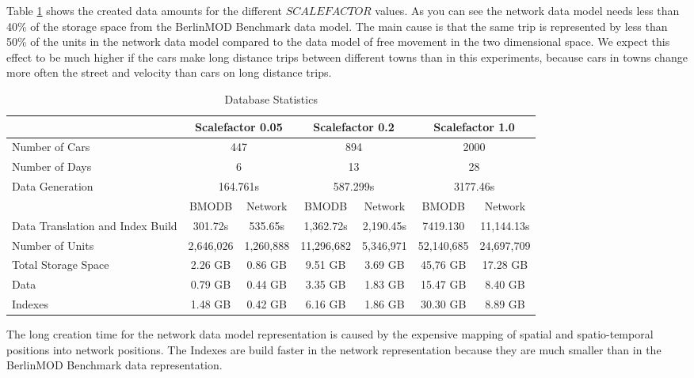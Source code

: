 \documentclass[a4paper]{article}
\newcommand{\bmodb} {BerlinMOD Benchmark}
\begin{document}
Table \ref{tab:dbstat} shows the created data amounts for the different $SCALEFACTOR$
values. As you can see the network data model needs less than 40\% of the storage
space from the \bmodb{} data model. The main cause is that the same trip is represented
by less than 50\% of the units in the network data model compared to the data
model of free movement in the two dimensional space. We expect this effect to be much
higher if the cars make long distance trips between different towns than in this
experiments, because cars in towns change more often the street and velocity than
cars on long distance trips.
\begin{table}[H]
\begin{center}
\begin{scriptsize}
\begin{tabularx}{1.0\textwidth}{|X|c|c|c|c|c|c|}
\hline
&\multicolumn{2}{c|}{\textbf{Scalefactor 0.05}}&\multicolumn{2}{c|}{\textbf{Scalefactor 0.2}}&\multicolumn{2}{c|}{\textbf{Scalefactor 1.0}}\\
\hline
Number of Cars&\multicolumn{2}{c|}{447}&\multicolumn{2}{c|}{894}&\multicolumn{2}{c|}{2000}\\
\hline
Number of Days&\multicolumn{2}{c|}{6}&\multicolumn{2}{c|}{13}&\multicolumn{2}{c|}{28}\\
\hline
Data Generation&\multicolumn{2}{c|}{164.761s}&\multicolumn{2}{c|}{587.299s}&\multicolumn{2}{c|}{3177.46s}\\
\hline
&BMODB&Network&BMODB&Network&BMODB&Network\\
\hline
Data Translation
and Index Build&301.72s&535.65s&1,362.72s&2,190.45s&7419.130&11,144.13s\\
\hline
Number of Units&2,646,026&1,260,888&11,296,682&5,346,971&52,140,685&24,697,709\\
\hline
Total Storage Space&2.26 GB&0.86 GB&9.51 GB&3.69 GB&45,76 GB&17.28 GB\\
Data&0.79 GB&0.44 GB&3.35 GB&1.83 GB&15.47 GB& 8.40 GB\\
Indexes&1.48 GB&0.42 GB&6.16 GB&1.86 GB&30.30 GB&8.89 GB\\
\hline
\end{tabularx}
\end{scriptsize}
\caption{Database Statistics}
\label{tab:dbstat}
\end{center}
\end{table}
The long creation time for the network data model representation is
caused by the expensive mapping of spatial and spatio-temporal positions into
network positions. The Indexes are build faster in the network representation
because they are much smaller than in the \bmodb{} data representation.
\end{document}
